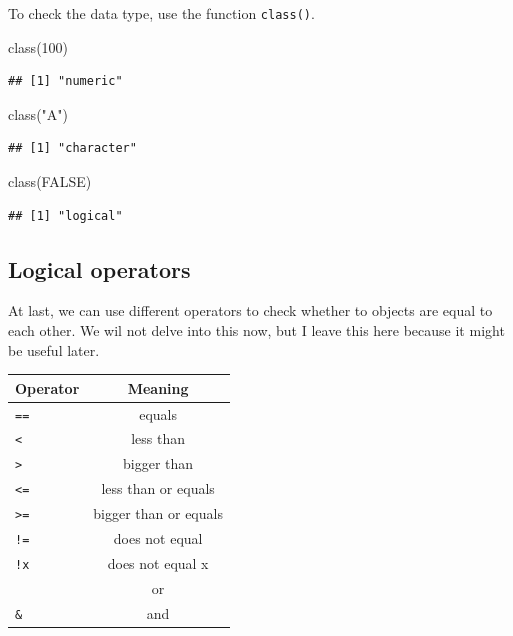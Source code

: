 \documentclass[
]{article}
\newenvironment{Shaded}{\begin{snugshade}}{\end{snugshade}}
\newcommand{\ConstantTok}[1]{\textcolor[rgb]{0.00,0.00,0.00}{#1}}
\newcommand{\DecValTok}[1]{\textcolor[rgb]{0.00,0.00,0.81}{#1}}
\newcommand{\FunctionTok}[1]{\textcolor[rgb]{0.00,0.00,0.00}{#1}}
\newcommand{\NormalTok}[1]{#1}
\newcommand{\StringTok}[1]{\textcolor[rgb]{0.31,0.60,0.02}{#1}}
\begin{document}
To check the data type, use the function \texttt{class()}.

\begin{Shaded}
\begin{Highlighting}[]
\FunctionTok{class}\NormalTok{(}\DecValTok{100}\NormalTok{)}
\end{Highlighting}
\end{Shaded}

\begin{verbatim}
## [1] "numeric"
\end{verbatim}

\begin{Shaded}
\begin{Highlighting}[]
\FunctionTok{class}\NormalTok{(}\StringTok{"A"}\NormalTok{)}
\end{Highlighting}
\end{Shaded}

\begin{verbatim}
## [1] "character"
\end{verbatim}

\begin{Shaded}
\begin{Highlighting}[]
\FunctionTok{class}\NormalTok{(}\ConstantTok{FALSE}\NormalTok{)}
\end{Highlighting}
\end{Shaded}

\begin{verbatim}
## [1] "logical"
\end{verbatim}

\hypertarget{logical-operators}{%
\subsection{Logical operators}\label{logical-operators}}

At last, we can use different operators to check whether to objects are
equal to each other. We wil not delve into this now, but I leave this
here because it might be useful later.

\begin{longtable}[]{@{}lc@{}}
\toprule
Operator & Meaning \\
\midrule
\endhead
\texttt{==} & equals \\
\texttt{\textless{}} & less than \\
\texttt{\textgreater{}} & bigger than \\
\texttt{\textless{}=} & less than or equals \\
\texttt{\textgreater{}=} & bigger than or equals \\
\texttt{!=} & does not equal \\
\texttt{!x} & does not equal x \\
\texttt{\textbar{}} & or \\
\texttt{\&} & and \\
\bottomrule
\end{longtable}
\end{document}
